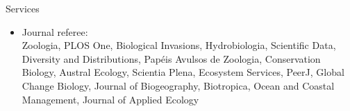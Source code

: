 \documentclass{resume}
\begin{document}

\begin{rSection}{Services}
\begin{itemize}
\item Journal referee:\\
Zoologia, PLOS One, Biological Invasions, Hydrobiologia, Scientific Data, Diversity and Distributions, Papéis Avulsos de Zoologia, Conservation Biology, Austral Ecology, Scientia Plena, Ecosystem Services, PeerJ, Global Change Biology, Journal of Biogeography, Biotropica, Ocean and Coastal Management, Journal of Applied Ecology 
\end{itemize}
\end{rSection}

\end{document}
